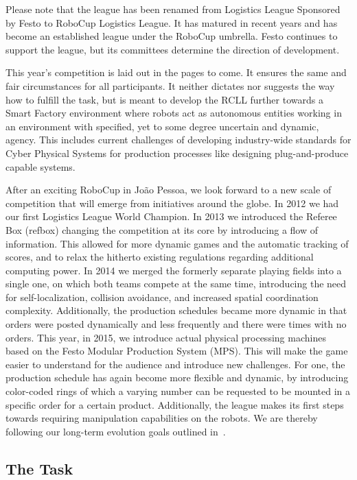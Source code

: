 \documentclass[12pt,twoside]{article}
\begin{document}
Please note that the league has been renamed from Logistics League
Sponsored by Festo to RoboCup Logistics League. It has matured in
recent years and has become an established league under the RoboCup
umbrella. Festo continues to support the league, but its committees
determine the direction of development.

This year's competition is laid out in the pages to come.  It ensures
the same and fair circumstances for all participants. It neither
dictates nor suggests the way how to fulfill the task, but is meant to
develop the RCLL further towards a Smart Factory environment where
robots act as autonomous entities working in an environment with
specified, yet to some degree uncertain and dynamic, agency. This
includes current challenges of developing industry-wide standards for
Cyber Physical Systems for production processes like designing
plug-and-produce capable systems.

After an exciting RoboCup in Jo\~ao Pessoa, we look forward to a new
scale of competition that will emerge from initiatives around the
globe. In 2012 we had our first Logistics League World Champion.  In
2013 we introduced the Referee Box (refbox) changing the competition
at its core by introducing a flow of information. This allowed for
more dynamic games and the automatic tracking of scores, and to relax
the hitherto existing regulations regarding additional computing
power. In 2014 we merged the formerly separate playing fields into a
single one, on which both teams compete at the same time, introducing
the need for self-localization, collision avoidance, and increased
spatial coordination complexity. Additionally, the production
schedules became more dynamic in that orders were posted dynamically
and less frequently and there were times with no orders. This year, in
2015, we introduce actual physical processing machines based on the
Festo Modular Production System (MPS). This will make the game easier
to understand for the audience and introduce new challenges. For one,
the production schedule has again become more flexible and dynamic, by
introducing color-coded rings of which a varying number can be
requested to be mounted in a specific order for a certain
product. Additionally, the league makes its first steps towards
requiring manipulation capabilities on the robots. We are thereby
following our long-term evolution goals outlined in~\cite{wdrl2013}.

\subsection{The Task}
\label{sec:task}
\end{document}

